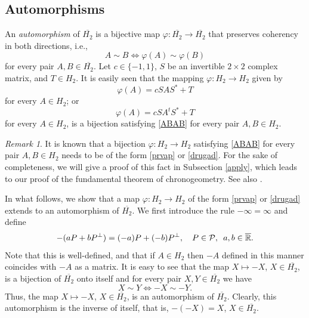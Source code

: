 \documentclass[10pt]{amsart}
\theoremstyle{definition}
\theoremstyle{remark}
\newtheorem{remark}[theorem]{Remark}
\numberwithin{subsection}{section}
\numberwithin{equation}{section}
\newcommand\oH{{\overline{H_2}}}
\newcommand\oR{{\overline{\mathbb{R}}}}
\begin{document}
\subsection{Automorphisms}\label{automorphism}
An \emph{automorphism}  of $\oH$ is a bijective map $\varphi \colon \oH \to \oH$ that preserves coherency in both directions, i.e., 
\begin{equation}\label{ABAB}
A \sim B \iff \varphi (A) \sim \varphi (B)
\end{equation}
for every pair $A,B \in \oH$.
Let $c \in \{-1 , 1\}$, $S$ be an invertible $2 \times 2$ complex matrix, and $T \in H_2$. 
It is easily seen that the mapping $\varphi\colon H_2\to H_2$ given by 
\begin{equation}\label{prvap}
\varphi (A) = c SAS^\ast + T
\end{equation}
for every $A \in H_2$; or
\begin{equation}\label{drugad}
\varphi (A) = c SA^t S^\ast + T
\end{equation}
for every $A \in H_2$, is a bijection satisfying \eqref{ABAB} for every pair $A,B \in H_2$.


\begin{remark}\label{m4h2}
It is known that a bijection $\varphi\colon H_2\to H_2$ satisfying \eqref{ABAB} for every pair $A,B \in H_2$ needs to be of the form \eqref{prvap} or \eqref{drugad}. 
For the sake of completeness, we will give a proof of this fact in Subsection \ref{apply}, which leads to our proof of the fundamental theorem of chronogeometry.
See also \cite[Subsection 5.3]{Hua}.
\end{remark}

In what follows, we show that a map $\varphi\colon H_2\to H_2$ of the form \eqref{prvap} or \eqref{drugad} extends to an automorphism of $\oH$.
We first introduce the rule $-\infty = \infty$ and define
\[
-( a P + bP^{\perp}) =  (-a) P +(-b)P^{\perp}, \ \ \ P\in \mathcal{P}, \ \, a,b \in \oR.\index{$A$0@$-A$}
\]
Note that this is well-defined, and that if $A\in H_2$ then $-A$ defined in this manner coincides with $-A$ as a matrix.
It is easy to see that the map $X \mapsto -X$, $X  \in \oH$, is a bijection of $\oH$ onto itself and for every pair $X,Y \in \oH$ we have
\[
X \sim Y \iff - X \sim -Y.
\]
Thus, the map $X  \mapsto -X$, $X \in \oH$, is an automorphism of $\oH$. Clearly, this automorphism is the inverse of itself, that is, $-(-X) = X$, $X \in \oH$.
\end{document}
